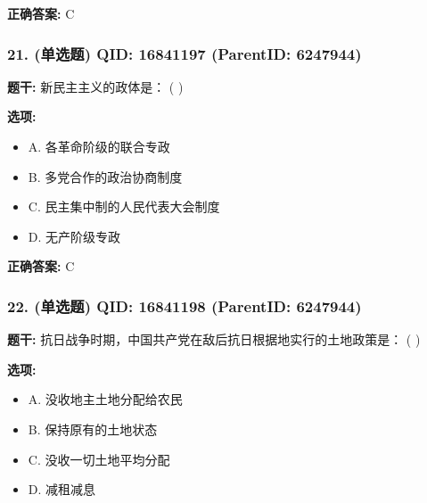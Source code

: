 \documentclass[12pt,UTF8]{ctexart}
\begin{document}
\textbf{正确答案:}
C

\vspace{0.3em}\hrulefill\vspace{0.7em}

\subsubsection*{21. (单选题) \small QID: 16841197 (ParentID: 6247944)}

\textbf{题干:}
新民主主义的政体是： ( )



\textbf{选项:}
\begin{itemize}[leftmargin=*]

  \item A. 各革命阶级的联合专政

  \item B. 多党合作的政治协商制度

  \item C. 民主集中制的人民代表大会制度

  \item D. 无产阶级专政

\end{itemize}

\textbf{正确答案:}
C

\vspace{0.3em}\hrulefill\vspace{0.7em}

\subsubsection*{22. (单选题) \small QID: 16841198 (ParentID: 6247944)}

\textbf{题干:}
抗日战争时期，中国共产党在敌后抗日根据地实行的土地政策是： ( )



\textbf{选项:}
\begin{itemize}[leftmargin=*]

  \item A. 没收地主土地分配给农民

  \item B. 保持原有的土地状态

  \item C. 没收一切土地平均分配

  \item D. 减租减息

\end{itemize}
\end{document}
